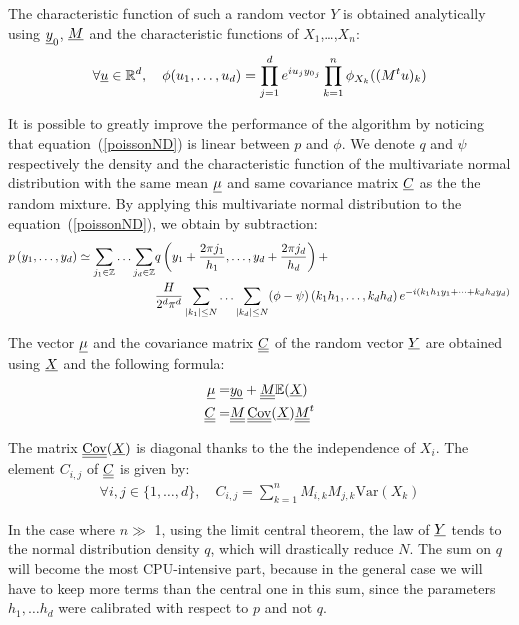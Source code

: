 The characteristic function of such a random vector $Y$ is obtained analytically using ${\underline{y}}_0$, ${\underline{M}}$ and the characteristic functions of $X_1$,\dots,$X_n$:
\begin{align}
  \forall {\underline{u}}\in\mathbb{R}^d,\quad\phi(u_1,\hdots,u_d)=\prod_{j=1}^de^{iu_j{y_0}_j}\prod_{k=1}^n\phi_{X_k}((M^tu)_k)
\end{align}

It is possible to greatly improve the performance of the algorithm by noticing that equation~(\ref{poissonND}) is linear between $p$
and $\phi $. We denote $q$ and $\psi$ respectively the density and the characteristic function of the multivariate normal distribution with the
same mean ${\underline{\mu}}$ and same covariance matrix ${\underline{C}}$ as the the random mixture. By applying this multivariate normal distribution to the equation~(\ref{poissonND}), we obtain by subtraction:
\begin{align}\label{algoPoisson}
p\left(y_1,\hdots,y_d\right)\simeq \sum_{j_1\in\mathbb{Z}}\hdots\sum_{j_d\in\mathbb{Z}}
  &q\left(y_1+\frac{2\pi j_1}{h_1},\hdots,y_d+\frac{2\pi j_d}{h_d}\right)+\notag\\
  &\frac{H}{2^d\pi^d}\sum_{|k_1|\leq N}\hdots\sum_{|k_d|\leq N}(\phi-\psi)\left(k_1h_1,\hdots,k_dh_d\right)e^{-i(k_1h_1y_1+\cdots+k_dh_dy_d)}
\end{align}

The vector ${\underline{\mu}}$ and the covariance matrix ${\underline{\underline{C}}}$ of the random vector ${\underline{Y}}$ are obtained using ${\underline{X}}$ and the following formula:
\begin{align}
  {\underline{\mu}}=& {\underline{y_0}} + {\underline{\underline{M}}}\mathbb{E}({\underline{X}})\\
  {\underline{\underline{C}}}=&{\underline{\underline{M}}}\,{\underline{\underline{\mathrm{Cov}}}}({\underline{X}}){\underline{\underline{M}}}^t\\
\end{align}

The matrix ${\underline{\underline{\mathrm{Cov}}}}({\underline{X}})$ is diagonal thanks to the the independence of $X_i$.
The element $C_{i,j}$ of ${\underline{\underline{C}}}$ is given by:
\begin{align}
\forall i,j\in\{1,\hdots,d\},\quad C_{i,j}=\sum_{k=1}^nM_{i,k}M_{j,k}\mathrm{Var}(X_k)
\end{align}

In the case where $n \gg $ 1, using the limit central theorem, the law of ${\underline{Y}} $ tends to the normal distribution density $q$,
which will drastically reduce $N$.  The sum on $q$ will become the most CPU-intensive part, because in the general case we will
have to keep more terms than the central one in this sum, since the parameters $ h_1, \dots  h_d$ were calibrated
with respect to $p$ and not $q$.


